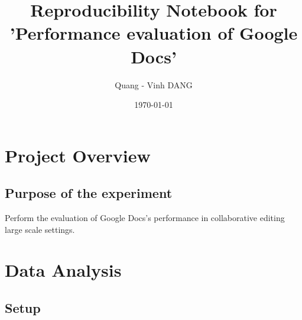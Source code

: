 \documentclass[10pt]{article}
\author{Quang - Vinh DANG}
\date{\today}
\title{Reproducibility Notebook for 'Performance evaluation of Google Docs'}
\begin{document}
\maketitle
\tableofcontents

\makeatletter
\renewcommand{\verbatim@font}{\ttfamily\footnotesize}
\makeatother


\section{Project Overview}
\label{sec-1}

\subsection{Purpose of the experiment}
\label{sec-1-1}
Perform the evaluation of Google Docs's performance in collaborative editing large scale settings.


\section{Data Analysis}
\label{sec-2}

\subsection{Setup}
\label{sec-2-1}
\end{document}
